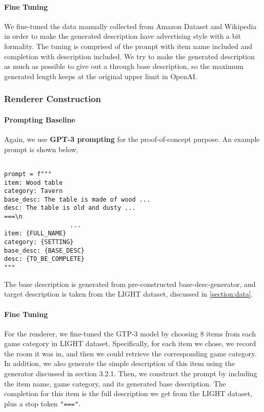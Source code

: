 \documentclass[11pt]{article}
\begin{document}
      \paragraph{Fine Tuning} We fine-tuned the data manually collected from Amazon Dataset and Wikipedia in order to make the generated description have advertising style with a bit formality. The tuning is comprised of the prompt with item name included and completion with description included. We try to make the generated description as much as possible to give out a through base description, so the maximum generated length keeps at the original upper limit in OpenAI.

    \subsubsection{Renderer Construction}
      \paragraph{Prompting Baseline} Again, we use \textbf{GPT-3 prompting} for the proof-of-concept purpose. An example prompt is shown below,
        \begin{lstlisting}

prompt = f"""
item: Wood table 
category: Tavern 
base_desc: The table is made of wood ... 
desc: The table is old and dusty ... 
===\n
                  ...
item: {FULL_NAME} 
category: {SETTING} 
base_desc: {BASE_DESC} 
desc: {TO_BE_COMPLETE}
"""
        \end{lstlisting}
        The base description is generated from pre-constructed base-desc-generator, and target description 
          is taken from the LIGHT dataset, discussed in \cref{section:data}.

      \paragraph{Fine Tuning} For the renderer, we fine-tuned the GTP-3 model by choosing 8 items from each game category in LIGHT dataset. Specifically, for each item we chose, we record the room it was in, and then we could retrieve the corresponding game category. In addition, we also generate the simple description of this item using the generator discussed in section 3.2.1. Then, we construct the prompt by including the item name, game category, and its generated base description. The completion for this item is the full description we get from the LIGHT dataset, plus a stop token \lstinline{"==="}.
\end{document}
